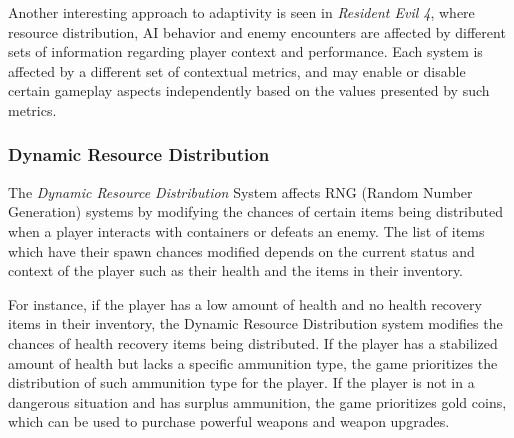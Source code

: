 
Another interesting approach to adaptivity is seen in \emph{Resident Evil 4}, where resource distribution, AI behavior and enemy encounters are affected by different sets of information regarding player context and performance. Each system is affected by a different set of contextual metrics, and may enable or disable certain gameplay aspects independently based on the values presented by such metrics.

\subsubsection{Dynamic Resource Distribution}

The \emph{Dynamic Resource Distribution} System affects RNG (Random Number Generation) systems by modifying the chances of certain items being distributed when a player interacts with containers or defeats an enemy. The list of items which have their spawn chances modified depends on the current status and context of the player such as their health and the items in their inventory.

For instance, if the player has a low amount of health and no health recovery items in their inventory, the Dynamic Resource Distribution system modifies the chances of health recovery items being distributed. If the player has a stabilized amount of health but lacks a specific ammunition type, the game prioritizes the distribution of such ammunition type for the player. If the player is not in a dangerous situation and has surplus ammunition, the game prioritizes gold coins, which can be used to purchase powerful weapons and weapon upgrades. 


